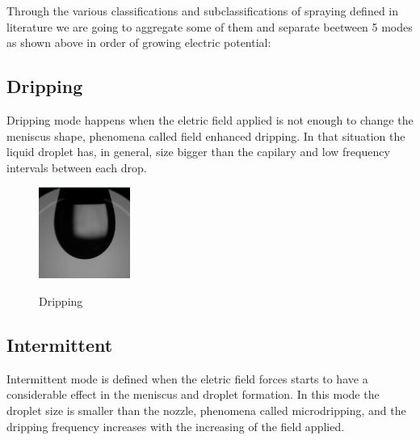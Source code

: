 Through the various classifications and subclassifications of spraying defined in literature we are going to aggregate some of them and separate beetween 5 modes as shown above in order of growing electric potential:

\subsection{Dripping}
\label{subsec:dripping}

Dripping mode happens when the eletric field applied is not enough to change the meniscus shape, phenomena called field enhanced dripping.
In that situation the liquid droplet has, in general, size bigger than the capilary and low frequency intervals between each drop.

\begin{figure}[H]
  \center
  \includegraphics[width=3cm]{Figuras/19:03/drip_example.png}
  \label{fig:drip_example}
  \caption{Dripping}
\end{figure}

\subsection{Intermittent}
\label{subsec:Intermittent}

Intermittent mode is defined when the eletric field forces starts to have a considerable effect in the meniscus and droplet formation. 
In this mode the droplet size is smaller than the nozzle, phenomena called microdripping, and the dripping frequency increases with the increasing of the field applied.


